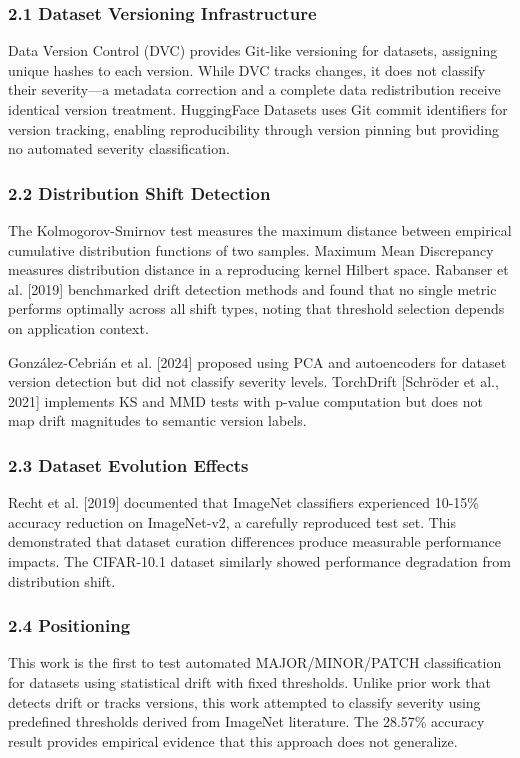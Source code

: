 
\subsubsection{2.1 Dataset Versioning Infrastructure}

Data Version Control (DVC) \citep{Kuprieievetal2020} provides Git-like versioning for datasets, assigning unique hashes to each version. While DVC tracks changes, it does not classify their severity—a metadata correction and a complete data redistribution receive identical version treatment. HuggingFace Datasets \citep{Lhoestetal2021} uses Git commit identifiers for version tracking, enabling reproducibility through version pinning but providing no automated severity classification.

\subsubsection{2.2 Distribution Shift Detection}

The Kolmogorov-Smirnov test \citep{Massey1951} measures the maximum distance between empirical cumulative distribution functions of two samples. Maximum Mean Discrepancy \citep{Grettonetal2012} measures distribution distance in a reproducing kernel Hilbert space. Rabanser et al. [2019] benchmarked drift detection methods and found that no single metric performs optimally across all shift types, noting that threshold selection depends on application context.

González-Cebrián et al. [2024] proposed using PCA and autoencoders for dataset version detection but did not classify severity levels. TorchDrift [Schröder et al., 2021] implements KS and MMD tests with p-value computation but does not map drift magnitudes to semantic version labels.

\subsubsection{2.3 Dataset Evolution Effects}

Recht et al. [2019] documented that ImageNet classifiers experienced 10-15\% accuracy reduction on ImageNet-v2, a carefully reproduced test set. This demonstrated that dataset curation differences produce measurable performance impacts. The CIFAR-10.1 dataset \citep{Rechtetal2018} similarly showed performance degradation from distribution shift.

\subsubsection{2.4 Positioning}

This work is the first to test automated MAJOR/MINOR/PATCH classification for datasets using statistical drift with fixed thresholds. Unlike prior work that detects drift or tracks versions, this work attempted to classify severity using predefined thresholds derived from ImageNet literature. The 28.57\% accuracy result provides empirical evidence that this approach does not generalize.
